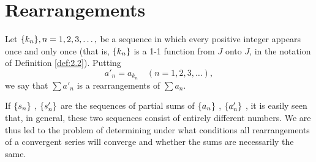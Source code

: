 \section{Rearrangements}
\begin{mydef}
    \label{def:3.52}
    Let $\protect\{k_n\}, n=1,2,3,\dots,$ be a sequence in which every positive integer appears once and only once 
    (that is, $\protect\{k_n\}$ is a 1-1 function from $J$ onto $J$, in the notation of Definition \ref{def:2.2}).
    Putting
    \begin{equation*}
        a'_n = a_{k_n} \quad (n = 1,2,3,\dots),
    \end{equation*}
    we say that $\sum a'_n$ is a rearrangements of $\sum a_n$.
\end{mydef}

If 
$\protect\{s_n\}$ ,
$\protect\{s'_n\}$ 
are the sequences of partial sums of 
$\protect\{a_n\}$ ,
$\protect\{a'_n\}$ ,
it is easily seen that, in general,
these two sequences consist of entirely different numbers.
We are thus led to the problem of determining under what conditions all rearrangements of a convergent series will converge and whether the sums are necessarily the same.

